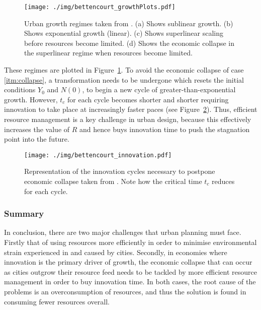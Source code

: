 \begin{figure}[h!]
	\centering
	\texttt{[image: ./img/bettencourt\_growthPlots.pdf]} 
	\caption{Urban growth regimes taken from \citet{Bettencourt2007}. (a) Shows sublinear growth. (b) Shows exponential growth (linear). (c) Shows superlinear scaling before resources become limited. (d) Shows the economic collapse in the superlinear regime when resources become limited.} \label{fig:bettencourt_growth}
\end{figure}
These regimes are plotted in Figure~\ref{fig:bettencourt_growth}. To avoid the economic collapse of case \eqref{itm:collapse}, a transformation needs to be undergone which resets the initial conditions $Y_0$ and $N(0)$, to begin a new cycle of greater-than-exponential growth. However, $t_c$ for each cycle becomes shorter and shorter requiring innovation to take place at increasingly faster paces (see Figure~\ref{fig:bettencourt_innovation}). Thus, efficient resource management is a key challenge in urban design, because this effectively increases the value of $R$ and hence buys innovation time to push the stagnation point into the future.

\begin{figure}[h!]
	\centering
	\texttt{[image: ./img/bettencourt\_innovation.pdf]} 
	\caption{Representation of the innovation cycles necessary to postpone economic collapse taken from \citet{Bettencourt2007}. Note how the critical time $t_c$ reduces for each cycle.} \label{fig:bettencourt_innovation}
\end{figure}

\subsubsection*{Summary}
In conclusion, there are two major challenges that urban planning must face. Firstly that of using resources more efficiently in order to minimise environmental strain experienced in and caused by cities. Secondly, in economies where innovation is the primary driver of growth, the economic collapse that can occur as cities outgrow their resource feed needs to be tackled by more efficient resource management in order to buy innovation time. In both cases, the root cause of the problems is an overconsumption of resources, and thus the solution is found in consuming fewer resources overall.

\clearpage
